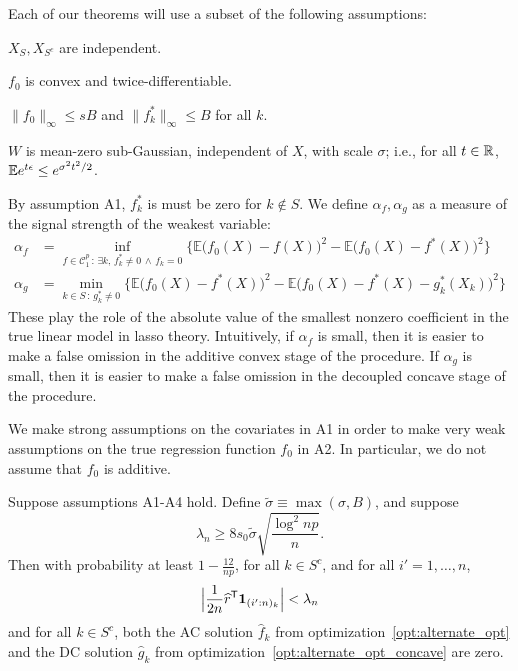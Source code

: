 Each of our theorems will use a subset of the following assumptions:
\begin{packed_enum}
\item[A1:] $X_S, X_{S^c}$ are independent. 
\item[A2:] $f_0$ is convex and twice-differentiable. 
\item[A3:] $\|f_0\|_\infty \leq sB$ and $\| f^*_k \|_\infty \leq B$ for all $k$.
\item[A4:] $W$ is mean-zero sub-Gaussian, independent of $X$, with scale $\sigma$; i.e., for all $t \in {\mathbb R}$, ${\mathbb E} e^{t \epsilon} \leq e^{\sigma^2 t^2 / 2}$.
\end{packed_enum}
By assumption A1, $f^*_k$ is must be zero for $k\notin S$.
We define $\alpha_f, \alpha_g$ as a measure of the signal strength of the weakest variable:
\begin{align*}
\alpha_f &= \inf_{f \in \mathcal{C}_1^p \,:\, \exists k ,\, f^*_k \neq 0 \,\wedge\, f_k = 0} 
       \Big\{ \mathbb{E} \big( f_0(X) - f(X) \big)^2 - 
        \mathbb{E} \big( f_0(X) - f^*(X) \big)^2  \Big\}\\
\alpha_g &=   \min_{k \in S \,:\, g^*_k \neq 0}
      \Big\{ \mathbb{E} \big( f_0(X) - f^*(X) \big)^2 - 
    \mathbb{E} \big( f_0(X) - f^*(X) - g^*_k(X_k) \big)^2 \Big\}
\end{align*}
These play the role of the absolute value of the smallest nonzero
coefficient in the true linear model in lasso theory.  Intuitively, if
$\alpha_f$ is small, then it is easier to make a false omission in the
additive convex stage of the procedure. If $\alpha_g$ is small, then
it is easier to make a false omission in the decoupled concave stage
of the procedure.

\begin{remark}
  We make strong assumptions on the covariates in A1 in order to make
  very weak assumptions on the true regression function $f_0$ in
  A2. In particular, we do not assume that $f_0$ is additive. 
\end{remark}


\begin{theorem}
\label{thm:false_positive}
Suppose assumptions A1-A4 hold. Define $\tilde{\sigma} \equiv \max(\sigma, B)$,
and suppose 
\begin{equation}
\lambda_n \geq 8 s_0 \tilde{\sigma}  \sqrt{ \frac{\log^2 np}{n}}.
\end{equation}  
Then with probability at least $ 1 - \frac{12}{np}$, for all $k \in
S^c$, and for all $i'=1,\ldots, n$,
\begin{equation}
\Big| \frac{1}{2n}\widehat{r}^{\mathsf{T}} \mbox{\boldmath $1$}_{(i':n)_k} \Big| < \lambda_n
\end{equation}
and for all $k \in S^c$, both the AC solution $\hat{f}_k$ from optimization~\eqref{opt:alternate_opt} and the DC solution $\hat{g}_k$ from optimization~\eqref{opt:alternate_opt_concave} are zero. 
\end{theorem}

